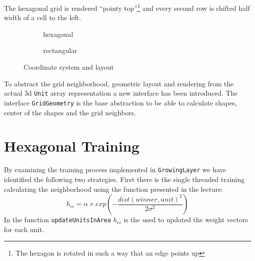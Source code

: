 \documentclass{acm_proc_article-sp}
\begin{document}
The hexagonal grid is rendered ``pointy top''\footnote{The hexagon is rotated in such a way that an edge points up} and every second row is shifted half width of a
cell to the left.

\begin{figure}
    \begin{subfigure}{1\linewidth}
    \centering
    \caption{hexagonal}
    \label{fig:coord-hex}
    \end{subfigure}

    \begin{subfigure}{1\linewidth}
        \centering
    \caption{rectangular}
    \label{fig:coord-rect}
    \end{subfigure}
    \caption{Coordinate system and layout}
    \label{fig:coord}
\end{figure}

To abstract the grid neighborhood, geometric layout and rendering from the actual 3d \lstinline!Unit! array
representation a new interface has been introduced. The interface \lstinline!GridGeometry! is the base abstraction
to be able to calculate shapes, center of the shapes and the grid neighbors.

\section{Hexagonal Training}

By examining the training process implemented in \lstinline!GrowingLayer! we have identified the following two strategies.
First there is the single threaded training calculating the neighborhood using the function presented in the lecture:
\[
    h_{ci} = \alpha \times exp \left(-\frac{dist(winner,unit)^2}{2\sigma^2}\right)
\]
In the function \lstinline!updateUnitsInArea! $h_{ci}$ is the used to updated the weight vectors for each unit.
\end{document}
